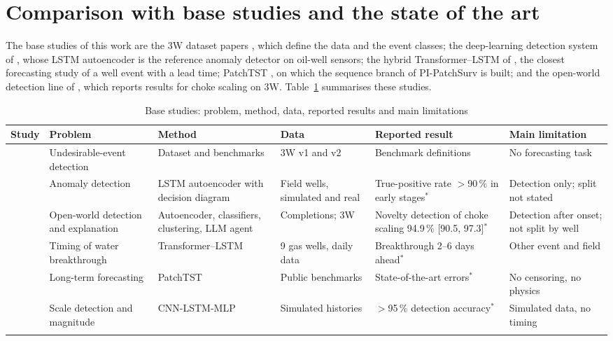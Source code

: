 \section{Comparison with base studies and the state of the art}\label{sec:comparison}

The base studies of this work are the 3W dataset papers \citep{vargas2019,vargas2026}, which define the data
and the event classes; the deep-learning detection system of \citet{aranha2024}, whose LSTM autoencoder is
the reference anomaly detector on oil-well sensors; the hybrid Transformer--LSTM of \citet{lai2026}, the
closest forecasting study of a well event with a lead time; PatchTST \citep{nie2023}, on which the sequence
branch of PI-PatchSurv is built; and the open-world detection line of \citet{lopes2025,lopes2026}, which
reports results for choke scaling on 3W. Table~\ref{tab:basepapers} summarises these studies.

\begin{table}[t]
\caption{Base studies: problem, method, data, reported results and main limitations}
\label{tab:basepapers}
\scriptsize\setlength{\tabcolsep}{3pt}
\begin{tabular*}{\textwidth}{@{\extracolsep\fill}p{1.8cm}p{1.7cm}p{2.0cm}p{1.6cm}p{2.2cm}p{2.1cm}}
\toprule
Study & Problem & Method & Data & Reported result & Main limitation \\
\midrule
\citet{vargas2019,vargas2026} & Undesirable-event detection & Dataset and benchmarks & 3W v1 and v2 & Benchmark definitions & No forecasting task \\
\citet{aranha2024} & Anomaly detection & LSTM autoencoder with decision diagram & Field wells, simulated and real & True-positive rate $>$90\,\% in early stages$^*$ & Detection only; split not stated \\
\citet{lopes2025,lopes2026} & Open-world detection and explanation & Autoencoder, classifiers, clustering, LLM agent & Completions; 3W & Novelty detection of choke scaling 94.9\,\% [90.5, 97.3]$^*$ & Detection after onset; not split by well \\
\citet{lai2026} & Timing of water breakthrough & Transformer--LSTM & 9 gas wells, daily data & Breakthrough 2--6 days ahead$^*$ & Other event and field \\
\citet{nie2023} & Long-term forecasting & PatchTST & Public benchmarks & State-of-the-art errors$^*$ & No censoring, no physics \\
\citet{cheng2022} & Scale detection and magnitude & CNN-LSTM-MLP & Simulated histories & $>$95\,\% detection accuracy$^*$ & Simulated data, no timing \\
\botrule
\end{tabular*}
\end{table}

